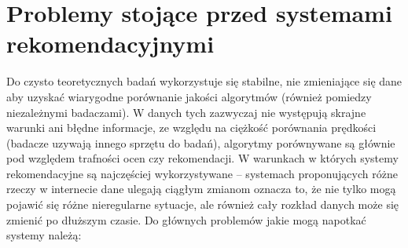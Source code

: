 \documentclass{pracamgr}
\begin{document}
   
   
  \section{Problemy stojące przed systemami rekomendacyjnymi}
   Do czysto teoretycznych badań wykorzystuje się stabilne, nie zmieniające się dane aby uzyskać wiarygodne porównanie jakości algorytmów
   (również pomiedzy niezależnymi badaczami). W danych tych zazwyczaj nie występują skrajne warunki ani błędne informacje,
   ze względu na ciężkość porównania prędkości (badacze uzywają innego sprzętu do badań),
   algorytmy porównywane są głównie pod względem trafności ocen czy rekomendacji.\newline
   W warunkach w których systemy rekomendacyjne są najczęściej wykorzystywane -- systemach proponujących różne rzeczy w internecie dane ulegają ciągłym zmianom
   oznacza to, że nie tylko mogą pojawić się różne nieregularne sytuacje, ale również cały rozkład danych może się zmienić po dłuższym czasie.
   Do głównych problemów jakie mogą napotkać systemy należą:
\end{document}
